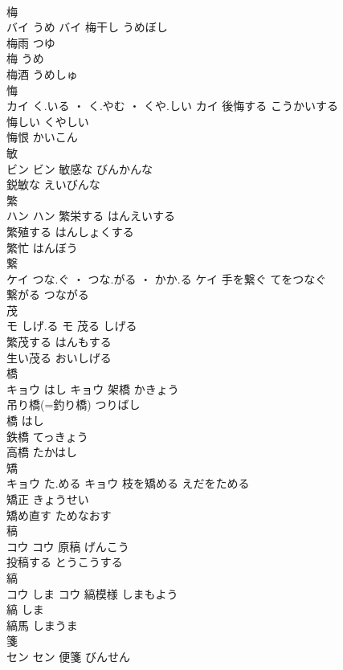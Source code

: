 \documentclass[8pt]{extreport}
\begin{document}
\begin{CJK}{UTF8}{min}
\\	梅	
\\	バイ	うめ	バイ	梅干し	うめぼし	
\\	梅雨	つゆ	
\\	梅	うめ	
\\	梅酒	うめしゅ	
\\	悔	
\\	カイ	く.いる ・ く.やむ ・ くや.しい	カイ	後悔する	こうかいする	
\\	悔しい	くやしい	
\\	悔恨	かいこん	
\\	敏	
\\	ビン		ビン	敏感な	びんかんな	
\\	鋭敏な	えいびんな	
\\	繁	
\\	ハン		ハン	繁栄する	はんえいする	
\\	繁殖する	はんしょくする	
\\	繁忙	はんぼう	
\\	繋	
\\	ケイ	つな.ぐ ・ つな.がる ・ かか.る	ケイ	手を繋ぐ	てをつなぐ	
\\	繋がる	つながる	
\\	茂	
\\	モ	しげ.る	モ	茂る	しげる	
\\	繁茂する	はんもする	
\\	生い茂る	おいしげる	
\\	橋	
\\	キョウ	はし	キョウ	架橋	かきょう	
\\	吊り橋(=釣り橋)	つりばし	
\\	橋	はし	
\\	鉄橋	てっきょう	
\\	高橋	たかはし	
\\	矯	
\\	キョウ	た.める	キョウ	枝を矯める	えだをためる	
\\	矯正	きょうせい	
\\	矯め直す	ためなおす	
\\	稿	
\\	コウ		コウ	原稿	げんこう	
\\	投稿する	とうこうする	
\\	縞	
\\	コウ	しま	コウ	縞模様	しまもよう	
\\	縞	しま	
\\	縞馬	しまうま	
\\	箋	
\\	セン		セン	便箋	びんせん	

\end{CJK}
\end{document}
